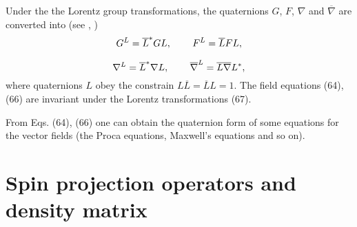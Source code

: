 \documentclass[a4paper,12pt]{article}
\begin{document}
Under the the Lorentz group transformations, the quaternions $G$,
$F$, $ \nabla $ and $\overline{\nabla }$ are converted into (see
\cite{Kruglov1}, \cite{monogr})
\[
G^L=\overline{L}^{*}GL,\hspace{0.3in}F^L=\overline{L}FL,
\]
\vspace{-8mm}
\begin{equation}
\label{67}
\end{equation}
\vspace{-8mm}
\[
\nabla ^L=\overline{L}^{*}\nabla L,\hspace{0.3in}\overline{\nabla
}^L= \overline{L}\overline{\nabla }L^{*} ,
\]
where quaternions $L$ obey the constrain
$L\overline{L}=\overline{L}L=1$. The field equations (64), (66)
are invariant under the Lorentz transformations (67).

From Eqs. (64), (66) one can obtain the quaternion form of some
equations for the vector fields (the Proca equations, Maxwell's
equations and so on).

\section{Spin projection operators and density matrix}
\end{document}
